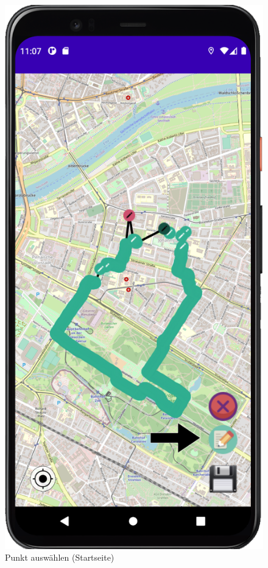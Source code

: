 \documentclass{article}
\begin{document}
\begin{enumerate}
\begin{figure}[H]
		  		\centering
				\caption{Punkt auswählen (Startseite)}
			\endminipage\hfill
		 		\includegraphics[width=\linewidth]{spoi_pic3_2.png}

\end{figure}
\end{enumerate}
\end{document}
